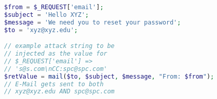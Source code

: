 \begin{lstlisting}[language=PHP,caption={PHP program with e-mail
      header injection vulnerability.},label={code:phpemi}, float]
$from = $_REQUEST['email'];
$subject = 'Hello XYZ';
$message = 'We need you to reset your password';
$to = 'xyz@xyz.edu';

// example attack string to be 
// injected as the value for
// $_REQUEST['email'] => 
// 's@s.com\nCC:spc@spc.com'
$retValue = mail($to, $subject, $message, "From: $from");
// E-Mail gets sent to both 
// xyz@xyz.edu AND spc@spc.com
\end{lstlisting}
